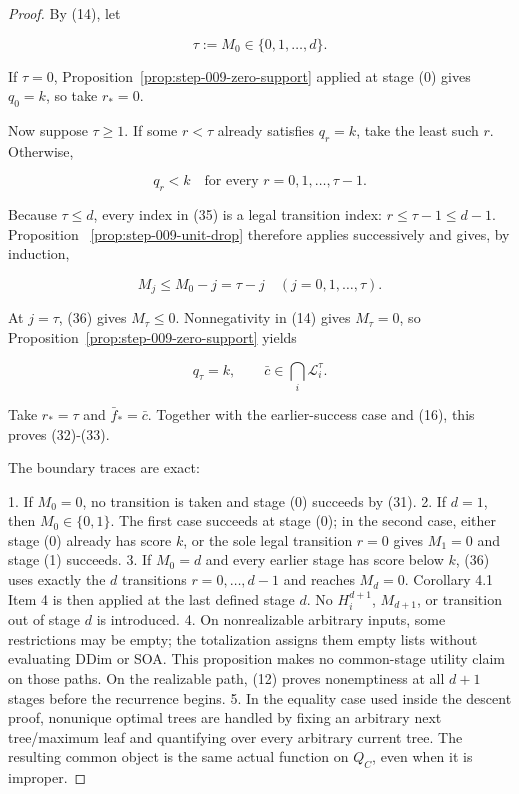 \begin{proof}
By (14), let

\[
 \tau:=M_0\in\{0,1,\ldots,d\}.
 \tag{34}
\]

If \(\tau=0\), Proposition~\ref{prop:step-009-zero-support} applied at
stage (0) gives \(q_0=k\), so take \(r_*=0\).

Now suppose \(\tau\ge1\). If some \(r<\tau\) already satisfies \(q_r=k\),
take the least such \(r\). Otherwise,

\[
 q_r<k\quad\text{for every }r=0,1,\ldots,\tau-1.
 \tag{35}
\]

Because \(\tau\le d\), every index in (35) is a legal transition index:
\(r\le\tau-1\le d-1\). Proposition
~\ref{prop:step-009-unit-drop} therefore applies successively and gives,
by induction,

\[
 M_j\le M_0-j=\tau-j
 \quad(j=0,1,\ldots,\tau).
 \tag{36}
\]

At \(j=\tau\), (36) gives \(M_\tau\le0\). Nonnegativity in (14) gives
\(M_\tau=0\), so Proposition~\ref{prop:step-009-zero-support} yields

\[
 q_\tau=k,
 \qquad
 \bar c\in\bigcap_i\mathcal L_i^\tau.
 \tag{37}
\]

Take \(r_*=\tau\) and \(\bar f_*=\bar c\). Together with the earlier-success
case and (16), this proves (32)-(33).

The boundary traces are exact:

1. If \(M_0=0\), no transition is taken and stage (0) succeeds by (31).
2. If \(d=1\), then \(M_0\in\{0,1\}\). The first case succeeds at stage
   (0); in the second case, either stage (0) already has score \(k\),
   or the sole legal transition \(r=0\) gives \(M_1=0\) and stage (1)
   succeeds.
3. If \(M_0=d\) and every earlier stage has score below \(k\), (36) uses
   exactly the \(d\) transitions \(r=0,\ldots,d-1\) and reaches
   \(M_d=0\). Corollary 4.1 Item 4 is then applied at the last defined
   stage \(d\). No \(H_i^{d+1}\), \(M_{d+1}\), or transition out of stage
   \(d\) is introduced.
4. On nonrealizable arbitrary inputs, some restrictions may be empty; the
   totalization assigns them empty lists without evaluating DDim or
   SOA. This proposition makes no common-stage utility claim on those
   paths. On the realizable path, (12) proves nonemptiness at all \(d+1\)
   stages before the recurrence begins.
5. In the equality case used inside the descent proof, nonunique optimal
   trees are handled by fixing an arbitrary next tree/maximum leaf and
   quantifying over every arbitrary current tree. The resulting common
   object is the same actual function on \(Q_C\), even when it is
   improper.


\end{proof}
